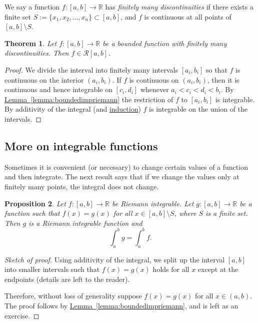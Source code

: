 \documentclass[12pt]{book}
\newcommand{\R}{{\mathbb{R}}}
\newcommand{\sR}{{\mathcal{R}}}
\newcommand{\myindex}[1]{#1\index{#1}}
\theoremstyle{plain}
\newtheorem{thm}{Theorem}[section]
\newtheorem{prop}[thm]{Proposition}
\theoremstyle{remark}
\theoremstyle{definition}
\theoremstyle{exercise}
\theoremstyle{example}
\newcommand{\lemmaref}[1]{\hyperref[#1]{Lemma~\ref*{#1}}}
\begin{document}
We say a function $f \colon [a,b] \to \R$ has \emph{\myindex{finitely many
discontinuities}} if there exists a finite set $S := \{ x_1, x_2, \ldots, x_n \}
\subset [a,b]$, and $f$ is continuous
at all points of $[a,b] \setminus S$.

\begin{thm}
Let $f \colon [a,b] \to \R$ be a bounded function with finitely
many discontinuities.  Then $f \in \sR[a,b]$.
\end{thm}

\begin{proof}
We divide the interval into finitely many intervals $[a_i,b_i]$
so that $f$ is continuous
on the interior $(a_i,b_i)$.  If $f$ is continuous on $(a_i,b_i)$,
then it is continuous and hence integrable on $[c_i,d_i]$ whenever $a_i < c_i < d_i < b_i$.  By
\lemmaref{lemma:boundedimpriemann}
the restriction
of $f$ to $[a_i,b_i]$ is integrable.  By additivity of the integral (and
\hyperref[induction:thm]{induction}) $f$ is integrable on the union of the intervals.
\end{proof}

\subsection{More on integrable functions}

Sometimes it is convenient (or necessary)
to change certain values of a function and
then integrate.  The next result says
that if we change the values only at finitely
many points, the integral does not change.

\begin{prop}
Let $f \colon [a,b] \to \R$ be Riemann integrable.  Let $g \colon [a,b] \to
\R$ be a function such that $f(x) = g(x)$ for all $x \in [a,b] \setminus S$,
where $S$ is a finite set.  Then $g$ is a Riemann integrable function
and
\begin{equation*}
\int_a^b g = \int_a^b f.
\end{equation*}
\end{prop}

\begin{proof}[Sketch of proof]
Using additivity of the integral, we split up the interval $[a,b]$ into
smaller intervals such that $f(x) = g(x)$ holds for all $x$ except at the
endpoints (details are left to the reader).

Therefore, without loss of generality suppose $f(x) = g(x)$ for
all $x \in (a,b)$.  The proof follows by \lemmaref{lemma:boundedimpriemann},
and is left as an exercise.
\end{proof}
\end{document}
